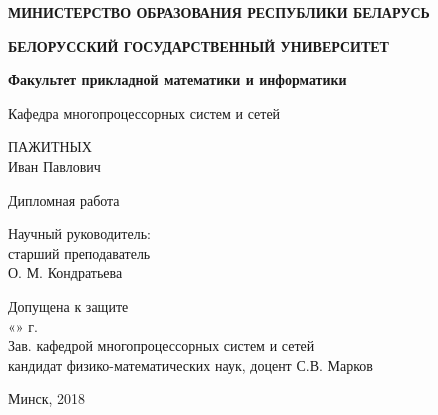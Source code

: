 \begin{titlepage}
    \begin{center}
         \textbf{МИНИСТЕРСТВО ОБРАЗОВАНИЯ РЕСПУБЛИКИ БЕЛАРУСЬ}
    \end{center}
    \begin{center}
         \textbf{БЕЛОРУССКИЙ ГОСУДАРСТВЕННЫЙ УНИВЕРСИТЕТ}
    \end{center}
    \begin{center}
         \textbf{Факультет прикладной математики и информатики}
    \end{center}
    \begin{center}
        Кафедра многопроцессорных систем и сетей
    \end{center}

    \vspace{4em}
    
    \begin{center}
        ПАЖИТНЫХ \\
        Иван Павлович
    \end{center}
    
    \vspace{2em}

    \begin{center}
        \textbf{\@jobtitle}
    \end{center}

    \vspace{1em}

    \begin{center}
        Дипломная работа
    \end{center}

    \vspace{2em}

    \begin{flushright}
        Научный руководитель:\\
        старший преподаватель \\
        О. М. Кондратьева \quad \; \: \\
    \end{flushright}

    \vspace{1em}

    \begin{flushleft}
        Допущена к защите \\
        \vspace{0.5em}
        «\qquad» \qquad\qquad{} г. \\
        \vspace{0.5em}
        Зав. кафедрой многопроцессорных систем и сетей \\
        кандидат физико-математических наук, доцент С.В. Марков \\
    \end{flushleft}

    \vfill

    \begin{center}
        Минск, 2018
    \end{center}
\end{titlepage}
\newpage
